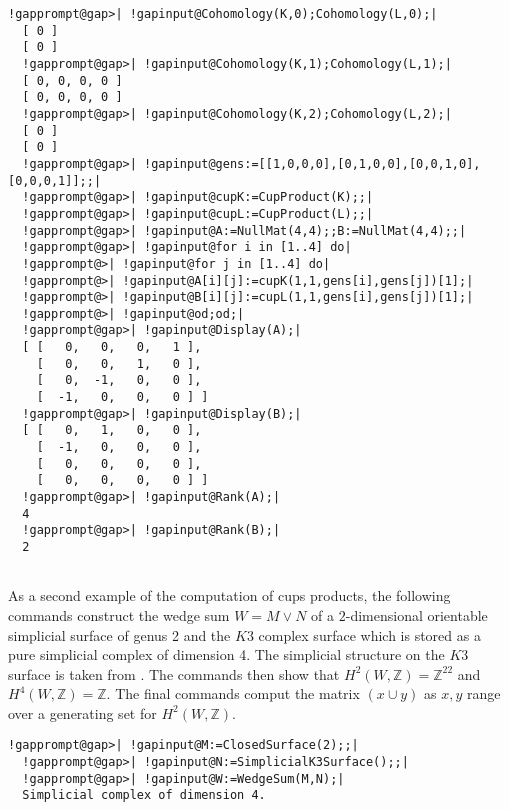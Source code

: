 \documentclass[a4paper,11pt]{report}
\begin{document}
{{\begin{Verbatim}[commandchars=!@|,fontsize=\small,frame=single,label=Example]
  !gapprompt@gap>| !gapinput@Cohomology(K,0);Cohomology(L,0);|
  [ 0 ]
  [ 0 ]
  !gapprompt@gap>| !gapinput@Cohomology(K,1);Cohomology(L,1);|
  [ 0, 0, 0, 0 ]
  [ 0, 0, 0, 0 ]
  !gapprompt@gap>| !gapinput@Cohomology(K,2);Cohomology(L,2);|
  [ 0 ]
  [ 0 ]
  !gapprompt@gap>| !gapinput@gens:=[[1,0,0,0],[0,1,0,0],[0,0,1,0],[0,0,0,1]];;|
  !gapprompt@gap>| !gapinput@cupK:=CupProduct(K);;|
  !gapprompt@gap>| !gapinput@cupL:=CupProduct(L);;|
  !gapprompt@gap>| !gapinput@A:=NullMat(4,4);;B:=NullMat(4,4);;|
  !gapprompt@gap>| !gapinput@for i in [1..4] do|
  !gapprompt@>| !gapinput@for j in [1..4] do|
  !gapprompt@>| !gapinput@A[i][j]:=cupK(1,1,gens[i],gens[j])[1];|
  !gapprompt@>| !gapinput@B[i][j]:=cupL(1,1,gens[i],gens[j])[1];|
  !gapprompt@>| !gapinput@od;od;|
  !gapprompt@gap>| !gapinput@Display(A);|
  [ [   0,   0,   0,   1 ],
    [   0,   0,   1,   0 ],
    [   0,  -1,   0,   0 ],
    [  -1,   0,   0,   0 ] ]
  !gapprompt@gap>| !gapinput@Display(B);|
  [ [   0,   1,   0,   0 ],
    [  -1,   0,   0,   0 ],
    [   0,   0,   0,   0 ],
    [   0,   0,   0,   0 ] ]
  !gapprompt@gap>| !gapinput@Rank(A);|
  4
  !gapprompt@gap>| !gapinput@Rank(B);|
  2
  
\end{Verbatim}
 

 As a second example of the computation of cups products, the following
commands construct the wedge sum $W=M\vee N$ of a $2$-dimensional orientable simplicial surface of genus 2 and the $K3$ complex surface which is stored as a pure simplicial complex of dimension 4.
The simplicial structure on the $K3$ surface is taken from \cite{spreerkhuenel}. The commands then show that $H^2(W,\mathbb Z)=\mathbb Z^{22}$ and $H^4(W,\mathbb Z)=\mathbb Z$. The final commands comput the matrix $(x\cup y)$ as $x,y$ range over a generating set for $H^2(W,\mathbb Z)$. 
\begin{Verbatim}[commandchars=!@|,fontsize=\small,frame=single,label=Example]
  !gapprompt@gap>| !gapinput@M:=ClosedSurface(2);;|
  !gapprompt@gap>| !gapinput@N:=SimplicialK3Surface();;|
  !gapprompt@gap>| !gapinput@W:=WedgeSum(M,N);|
  Simplicial complex of dimension 4.
  

\end{Verbatim}}}
\end{document}
